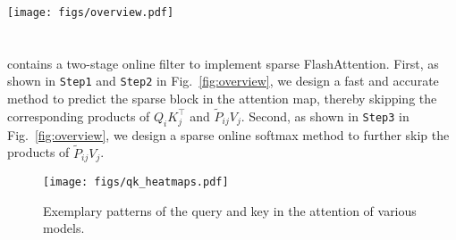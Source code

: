 \begin{figure*}[!th]
    \centering
    \texttt{[image: figs/overview.pdf]}
    \vspace{-.75em}
    \caption{Workflow of \our.}
    \vspace{-1.2em}
    \label{fig:overview}
\end{figure*}


\section{\our} \vspace{-.25em}
\our contains a two-stage online filter to implement sparse FlashAttention. First, as shown in \texttt{Step1} and \texttt{Step2} in Fig.~\ref{fig:overview}, we design a fast and accurate method to predict the sparse block in the attention map, thereby skipping the corresponding products of $Q_iK_j^\top$ and $\widetilde{P}_{ij} V_j$. Second, as shown in \texttt{Step3} in Fig.~\ref{fig:overview}, we design a sparse online softmax method to further skip the products of $\widetilde{P}_{ij} V_j$.



\begin{figure}[!h]
    \centering
    \vspace{-.1em}
    \texttt{[image: figs/qk\_heatmaps.pdf]}
    \vspace{-2em}
    \caption{Exemplary patterns of the query and key in the attention of various models.}
    \vspace{-1em}
    \label{fig:qk_heatmap}
\end{figure}
